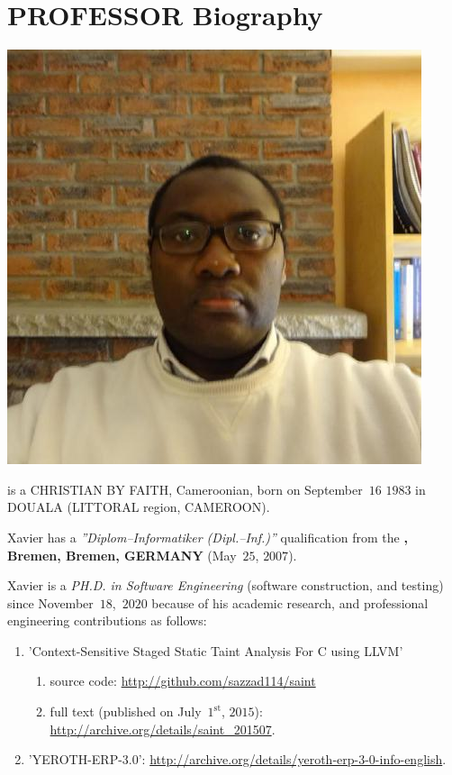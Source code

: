 \chapter{PROFESSOR Biography}\label{chap:biography}

\begin{center}
\includegraphics[scale=0.32]{../../francais/images/XavierNOUNDOU-2}
\label{fig:xaviernoumbis}
\end{center}

\textbf{\myfullacademicname} is a CHRISTIAN BY FAITH,
Cameroonian, born on September~$16$ $1983$ in
DOUALA (LITTORAL region, CAMEROON).

Xavier has a \textit{''Diplom--Informatiker (Dipl.--Inf.)''}
qualification from the \textbf{\unibremen, Bremen, Bremen, GERMANY} (May~$25$, $2007$).

Xavier is a \textit{PH.D. in Software Engineering}
(software construction, and testing) since November~$18$,~$2020$
because of his academic research, and professional engineering
contributions as follows:


\begin{enumerate}[1.]
	\item 'Context-Sensitive Staged Static Taint Analysis
			For C using LLVM'
		\begin{enumerate}[1.]
			\itemsep -0.7em
			\item source code: \url{http://github.com/sazzad114/saint}
			\item full text (published on July~$1^\text{st}$, $2015$): \url{http://archive.org/details/saint_201507}.
		\end{enumerate}		 

	\item 'YEROTH-ERP-3.0': \url{http://archive.org/details/yeroth-erp-3-0-info-english}.
\end{enumerate}